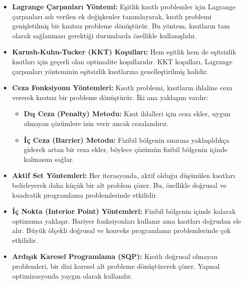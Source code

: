 \begin{itemize}
    \item \textbf{Lagrange Çarpanları Yöntemi:} Eşitlik kısıtlı problemler için Lagrange çarpanları adı verilen ek değişkenler tanımlayarak, kısıtlı problemi genişletilmiş bir kısıtsız probleme dönüştürür. Bu yöntem, kısıtların tam olarak sağlanması gerektiği durumlarda özellikle kullanışlıdır.
    
    \item \textbf{Karush-Kuhn-Tucker (KKT) Koşulları:} Hem eşitlik hem de eşitsizlik kısıtları için geçerli olan optimalite koşullarıdır. KKT koşulları, Lagrange çarpanları yönteminin eşitsizlik kısıtlarına genelleştirilmiş halidir.
    
    \item \textbf{Ceza Fonksiyonu Yöntemleri:} Kısıtlı problemi, kısıtların ihlaline ceza vererek kısıtsız bir probleme dönüştürür. İki ana yaklaşım vardır:
    \begin{itemize}
        \item \textbf{Dış Ceza (Penalty) Metodu:} Kısıt ihlalleri için ceza ekler, uygun olmayan çözümlere izin verir ancak cezalandırır.
        \item \textbf{İç Ceza (Barrier) Metodu:} Fizibil bölgenin sınırına yaklaşıldıkça giderek artan bir ceza ekler, böylece çözümün fizibil bölgenin içinde kalmasını sağlar.
    \end{itemize}
    
    \item \textbf{Aktif Set Yöntemleri:} Her iterasyonda, aktif olduğu düşünülen kısıtları belirleyerek daha küçük bir alt problem çözer. Bu, özellikle doğrusal ve kuadratik programlama problemlerinde etkilidir.
    
    \item \textbf{İç Nokta (Interior Point) Yöntemleri:} Fizibil bölgenin içinde kalarak optimuma yaklaşır. Bariyer fonksiyonları kullanır ama kısıtları doğrudan ele alır. Büyük ölçekli doğrusal ve konveks programlama problemlerinde çok etkilidir.
    
    \item \textbf{Ardışık Karesel Programlama (SQP):} Kısıtlı doğrusal olmayan problemleri, bir dizi karesel alt probleme dönüştürerek çözer. Yapısal optimizasyonda yaygın olarak kullanılır.
\end{itemize}

